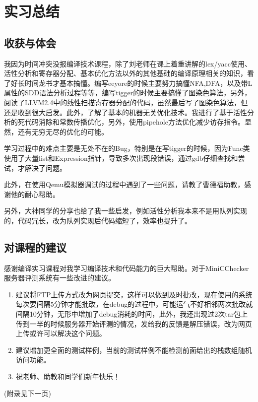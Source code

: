 \documentclass[UTF8]{article}
\begin{document}
\section{实习总结}
\subsection{收获与体会}
我因为时间冲突没报编译技术课程，除了刘老师在课上着重讲解的lex/yacc使用、活性分析和寄存器分配、基本优化方法以外的其他基础的编译原理相关的知识，看了好长时间龙书才基本搞懂。编写eeyore的时候主要努力搞懂NFA,DFA，以及带L属性的SDD语法分析过程等等，编写tigger的时候主要搞懂了图染色算法，另外，阅读了LLVM2.4中的线性扫描寄存器分配的代码，虽然最后写了图染色算法，但还是收到很大启发。此外，了解了基本的机器无关优化技术。我进行了基于活性分析的死代码消除和常数传播优化，另外，使用pipehole方法优化减少访存指令。显然，还有无穷无尽的优化的可能。

学习过程中的难点主要是无处不在的Bug，特别是在写tigger的时候，因为Func类使用了大量list和Expression指针，导致多次出现段错误，通过gdb仔细查找和尝试，才解决了问题。

此外，在使用Qemu模拟器调试的过程中遇到了一些问题，请教了曹德福助教，感谢他的耐心帮助。

另外，大神同学的分享也给了我一些启发，例如活性分析我本来不是用队列实现的，代码冗长，改为队列实现后代码缩短了，效率也提升了。
\subsection{对课程的建议}
感谢编译实习课程对我学习编译技术和代码能力的巨大帮助。对于MiniCChecker服务器评测系统有一些改进的建议。
\begin{enumerate}
\item 建议将FTP上传方式改为网页提交，这样可以做到及时批改，现在使用的系统每次要间隔5分钟才能批改，在debug的过程中，可能运气不好相邻两次批改就间隔10分钟，无形中增加了debug消耗的时间，此外，我还出现过2次tar包上传到一半的时候服务器开始评测的情况，发给我的反馈是解压错误，改为网页上传或许可以解决这个问题。
\item 建议增加更全面的测试样例，当前的测试样例不能检测前面给出的栈数组随机访问功能。
\item 祝老师、助教和同学们新年快乐！
\end{enumerate}
(附录见下一页)
\newpage
\appendix
\end{document}
